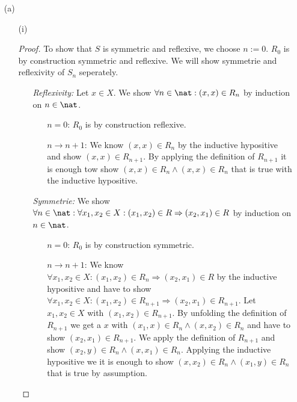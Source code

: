 \begin{answer}
  \begin{itemize}
    \item[(a)]
      \begin{itemize}
        \item[(i)]
          \begin{proof}
            To show that $S$ is symmetric and reflexive, we choose $n := 0$. $R_0$ is by construction symmetric and reflexive.
            We will show symmetrie and reflexivity of $S_n$ seperately.
            \begin{itemize}
              \item[\emph{Reflexivity:}]
                Let $x \in X$. We show $\forall n\in\nat: (x, x) \in R_n$ by induction on $n\in\nat$.
                \begin{itemize}
                  \item[$n=0$:]
                    $R_0$ is by construction reflexive.
                  \item[$n \rightarrow n+1$:]
                    We know $(x, x) \in R_n$ by the inductive hypositive and show $(x, x) \in R_{n+1}$. By applying the definition of $R_{n+1}$
                    it is enough tow show $(x, x) \in R_n \land (x, x) \in R_n$ that is true with the inductive hypositive.
                \end{itemize}
                \item[\emph{Symmetrie:}]
                We show $\forall n\in\nat: \forall x_1,x_2 \in X: (x_1, x_2) \in R \Rightarrow (x_2, x_1) \in R$ by induction on $n\in\nat$.
                \begin{itemize}
                  \item[$n=0$:]
                    $R_0$ is by construction symmetric.
                  \item[$n \rightarrow n+1$:]
                    We know $\forall x_1,x_2 \in X: (x_1, x_2) \in R_{n} \Rightarrow (x_2, x_1) \in R$ by the inductive hypositive and have to show
                    $\forall x_1, x_2 \in X: (x_1, x_2) \in R_{n+1} \Rightarrow (x_2, x_1) \in R_{n+1}$.
                    Let $x_1, x_2 \in X$ with $(x_1, x_2) \in R_{n+1}$. By unfolding the definition of $R_{n+1}$ we get a $x$ with
                    $(x_1, x) \in R_n \land (x, x_2) \in R_n$ and have to show $(x_2, x_1) \in R_{n+1}$.
                    We apply the definition of $R_{n+1}$ and show $(x_2, y) \in R_n \land (x, x_1) \in R_n$.
                    Applying the inductive hypositive we it is enough to show $(x, x_2) \in R_n \land (x_1, y) \in R_n$ that is true by assumption. \qedhere
                \end{itemize}
            \end{itemize}
          \end{proof} %


\end{itemize}
\end{itemize}
\end{answer}
